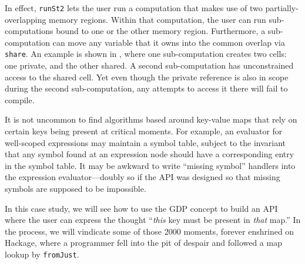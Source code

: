 \documentclass[format=sigplan, review=false, screen=true]{acmart}
\makeatletter
\let\origsection\section
\renewcommand\section{\@ifstar{\starsection}{\nostarsection}}
\newcommand\nostarsection[1]
{\sectionprelude\origsection{#1}\sectionpostlude}
\newcommand\starsection[1]
{\sectionprelude\origsection*{#1}\sectionpostlude}
\newcommand\sectionprelude{%
  \vspace{-0.5em}
}
\newcommand\sectionpostlude{%
  \vspace{0em}
}
\makeatother
\begin{document}
In effect, \texttt{runSt2} lets the user run a computation that makes use of
two partially-overlapping memory regions. Within that computation, the user
can run sub-computations bound to one or the other memory region. Furthermore,
a sub-computation can move any variable that it owns into the common overlap
via \texttt{share}. An example is shown in , where one sub-computation
creates two cells: one private, and the other shared. A second sub-computation has unconstrained
access to the shared cell. Yet even though the private reference is also in scope during
the second sub-computation, any attempts to access it there will fail to compile.

\section{Case Study \#3: Key-value lookups}

It is not uncommon to find algorithms based around key-value maps that rely
on certain keys being present at critical moments. For example, an evaluator for
well-scoped expressions may maintain a symbol table, subject to the
invariant that any symbol found at an expression node should have a corresponding entry in the
symbol table. It may be awkward to write ``missing symbol'' handlers into the expression
evaluator---doubly so if the API was designed so that missing symbols are supposed to
be impossible.

In this case study, we will see how to use the GDP concept to build an API where the
user can express the thought ``\emph{this} key must be present in \emph{that} map.''
In the process, we will vindicate  some of those
2000 moments, forever enshrined on Hackage, where a programmer fell into
the pit of despair and followed a map lookup by \texttt{fromJust}.
\end{document}
